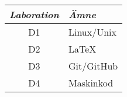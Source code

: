 \documentclass[a4paper]{memoir}
\begin{document}
\begin{Items}
    {\hspace{0.5cm}
    \begin{tabular}{cl}
        \emph{Laboration} & \emph{Ämne} \\ \midrule
        D1                & Linux/Unix  \\
        D2                & \LaTeX      \\
        D3                & Git/GitHub  \\
        D4                & Maskinkod   \\
    \end{tabular}
    }





\end{Items}
\end{document}
